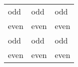 \documentclass{article}
\begin{document}
\begin{center}

\begin{tabular}{lll}
odd 	& odd 	& odd \\
even 	& even 	& even\\
odd 	& odd 	& odd \\
even 	& even 	& even\\
\end{tabular}
\end{center}
\end{document}
